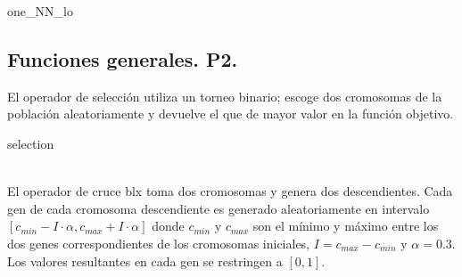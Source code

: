 \documentclass[11pt,a4paper]{article}
\theoremstyle{definition}
\begin{document}
	\begin{algorithm}[H]
		\caption{one\_NN\_lo}
	\end{algorithm}
	
	\subsection{Funciones generales. P2.}
		El operador de selección utiliza un torneo binario; escoge dos cromosomas de la población aleatoriamente y devuelve el que de mayor valor en la función objetivo.\\
		
		\begin{algorithm}[H]
		\caption{selection}
	\end{algorithm}~\\
		
		El operador de cruce blx toma dos cromosomas y genera dos descendientes. Cada gen de cada cromosoma descendiente es generado aleatoriamente en intervalo $[c_{min}-I\cdot \alpha, c_{max}+I\cdot \alpha]$ donde $c_{min}$ y $c_{max}$ son el mínimo y máximo entre los dos genes correspondientes de los cromosomas iniciales, $I=c_{max}-c_{min}$ y $\alpha=0.3$. Los valores resultantes en cada gen se restringen a $[0,1]$.\\
		
\end{document}
